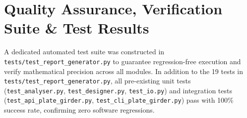 \documentclass[12pt,a4paper]{article}
\begin{document}
\newpage

\section{Quality Assurance, Verification Suite \& Test Results}

A dedicated automated test suite was constructed in \nolinkurl{tests/test_report_generator.py} to guarantee regression-free execution and verify mathematical precision across all modules. In addition to the 19 tests in \nolinkurl{tests/test_report_generator.py}, all pre-existing unit tests (\nolinkurl{test_analyser.py}, \nolinkurl{test_designer.py}, \nolinkurl{test_io.py}) and integration tests (\nolinkurl{test_api_plate_girder.py}, \nolinkurl{test_cli_plate_girder.py}) pass with 100\% success rate, confirming zero software regressions.
\end{document}
